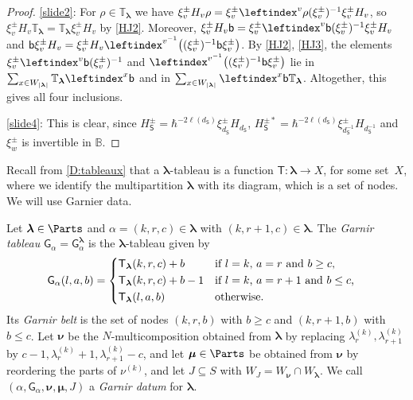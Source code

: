\documentclass[a4paper,11pt]{amsart}
\newcommand\blam{{\boldsymbol\lambda}}
\newcommand\bmu{{\boldsymbol\mu}}
\newcommand\bnu{{\boldsymbol\nu}}
\numberwithin{equation}{subsection}
\theoremstyle{definition}
\theoremstyle{theorem}
\theoremstyle{remark}
\newcommand\Sym{W}
\newcommand\xipm{\xi^\pm}
\newcommand\bb{\mathsf{b}}
\newcommand\bS{{\mathsf{S}}}
\newcommand\bT{{\mathsf{T}}}
\newcommand\bG{\mathsf{G}}
\newcommand\Tlam[1][\blam]{{\mathsf{T}_{#1}}}
\newcommand\Tos{\mathbb{T}}
\newcommand{\Bo}{\mathbb{B}}
\begin{document}
\begin{proof}
  \autoref{slide2}: For $\rho\in\Tos_\blam$ we have $\xipm_vH_v\rho=\xipm_v\leftindex^v{\rho}(\xipm_v)^{-1}\xipm_vH_v$,
  so $\xipm_vH_v\Tos_\blam=\Tos_\blam\xipm_vH_v$ by \autoref{HJ2}. Moreover,
  $\xipm_vH_v\bb=\xipm_v\leftindex^v\bb(\xipm_v)^{-1}\xipm_vH_v$ and
  $\bb\xipm_vH_v=\xipm_vH_v\leftindex^{v^{-1}}{\left((\xipm_v)^{-1}\bb\xipm_v\right)}$. By \autoref{HJ2}, \autoref{HJ3}, the elements $\xipm_v\leftindex^v\bb(\xipm_v)^{-1}$ and
  $\leftindex^{v^{-1}}{\left((\xipm_v)^{-1}\bb\xipm_v\right)}$ lie in
  $\sum_{x\in\Sym_{|\blam|}}\Tos_\blam\leftindex^x\bb$ and in
  $\sum_{x\in\Sym_{|\blam|}}\leftindex^x\bb\Tos_\blam$. Altogether, this gives all four inclusions.

  \autoref{slide4}: This is clear, since $H^\pm_\bS=\hbar^{-2\ell(d_\bS)}\xipm_{d_\bS}H_{d_\bS}$,
  $H^{\pm*}_\bS=\hbar^{-2\ell(d_\bS)}\xipm_{d_\bS^{-1}}H_{d_\bS^{-1}}$ and $\xipm_w$ is invertible in $\Bo$.
\end{proof}

Recall from \autoref{D:tableaux} that a $\blam$-tableau is a function $\bT\colon\blam\to X$, for
some set~$X$, where we identify the multipartition $\blam$ with its diagram, which is a set of nodes. We will use Garnier data.

\begin{Definition}\label{D:GarnirTableau}
  Let $\blam\in\Parts$ and $\alpha=(k,r,c)\in\blam$ with $(k,r+1,c)\in\blam$. The \emph{Garnir
  tableau} $\bG_\alpha=\bG^\blam_\alpha$ is the $\blam$-tableau given by
  \begin{align*}
    \bG_\alpha(l,a,b)&= \begin{cases*}
         \Tlam(k,r,c)+b   & if $l=k$, $a=r$   and $b\ge c$,\\
         \Tlam(k,r,c)+b-1 & if $l=k$, $a=r+1$ and $b\le c$,\\
         \Tlam(l,a,b)     & otherwise.
      \end{cases*}
  \end{align*}
  Its \emph{Garnir belt} is the set of nodes $(k,r,b)$ with $b\ge c$ and $(k,r+1,b)$ with $b\le c$.
  Let $\bnu$ be the $N$-multicomposition obtained from $\blam$ by replacing
  $\lambda^{(k)}_r,\lambda^{(k)}_{r+1}$ by $c-1,\lambda^{(k)}_r+1,\lambda^{(k)}_{r+1}-c$, and let
  $\bmu\in\Parts$ be obtained from $\bnu$ by reordering the parts of $\nu^{(k)}$, and let
  $J\subseteq S$ with $\Sym_J=\Sym_\bnu\cap\Sym_\blam$. We call $(\alpha,\bG_\alpha,\bnu,\bmu,J)$
  a \emph{Garnir datum} for $\blam$.
\end{Definition}
\end{document}
